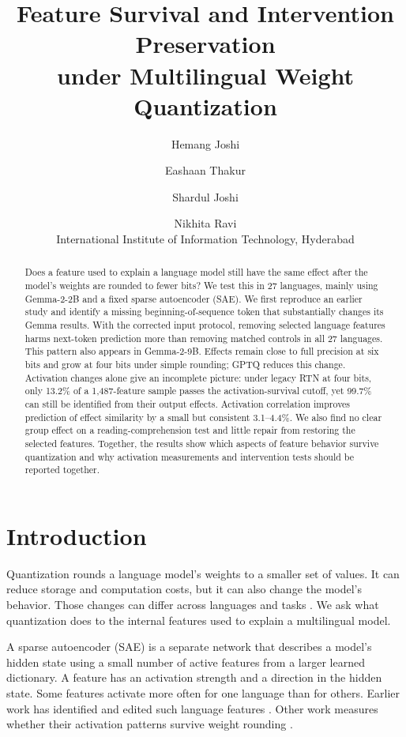 \documentclass[11pt]{article}
\title{Feature Survival and Intervention Preservation\\under Multilingual Weight Quantization}
\author{Hemang Joshi \and Eashaan Thakur \and Shardul Joshi \and Nikhita Ravi\\
International Institute of Information Technology, Hyderabad}
\begin{document}
\maketitle

\begin{abstract}
Does a feature used to explain a language model still have the same effect after the model's weights are rounded to fewer bits? We test this in 27 languages, mainly using Gemma-2-2B and a fixed sparse autoencoder (SAE). We first reproduce an earlier study and identify a missing beginning-of-sequence token that substantially changes its Gemma results. With the corrected input protocol, removing selected language features harms next-token prediction more than removing matched controls in all 27 languages. This pattern also appears in Gemma-2-9B. Effects remain close to full precision at six bits and grow at four bits under simple rounding; GPTQ reduces this change. Activation changes alone give an incomplete picture: under legacy RTN at four bits, only 13.2\% of a 1,487-feature sample passes the activation-survival cutoff, yet 99.7\% can still be identified from their output effects. Activation correlation improves prediction of effect similarity by a small but consistent 3.1--4.4\%. We also find no clear group effect on a reading-comprehension test and little repair from restoring the selected features. Together, the results show which aspects of feature behavior survive quantization and why activation measurements and intervention tests should be reported together.
\end{abstract}

\section{Introduction}
Quantization rounds a language model's weights to a smaller set of values. It can reduce storage and computation costs, but it can also change the model's behavior. Those changes can differ across languages and tasks \citep{marchisio-etal-2024-quantization}. We ask what quantization does to the internal features used to explain a multilingual model.

A sparse autoencoder (SAE) is a separate network that describes a model's hidden state using a small number of active features from a larger learned dictionary. A feature has an activation strength and a direction in the hidden state. Some features activate more often for one language than for others. Earlier work has identified and edited such language features \citep{deng-etal-2025-unveiling}. Other work measures whether their activation patterns survive weight rounding \citep{duan2026}.
\end{document}
